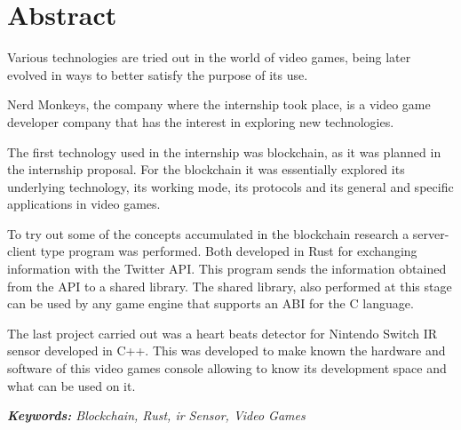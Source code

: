 \section*{Abstract}

Various technologies are tried out in the world of video games,
being later evolved in ways to better satisfy
the purpose of its use.

Nerd Monkeys, the company where the internship took place, is a video game developer company that has
the interest in exploring new technologies.

The first technology used in the internship was blockchain, as it was
planned in the internship proposal. For the blockchain it was essentially explored its underlying technology, its working mode, its protocols and its general and specific applications in video games.

To try out some of the concepts accumulated in the blockchain research
a server-client type program was performed. Both developed in Rust for exchanging information with the Twitter API. This program sends the information obtained from the API to a shared library. The shared library, also performed at this stage can be used by any game engine that supports an ABI for the C language.


The last project carried out was a heart beats detector for Nintendo Switch IR sensor developed in C++. This was developed to make known the hardware and software of this video games console allowing to know its development space and what can be used on it.

\textit{\textbf{Keywords:} Blockchain, Rust, \acrshort{ir} Sensor, Video Games}
